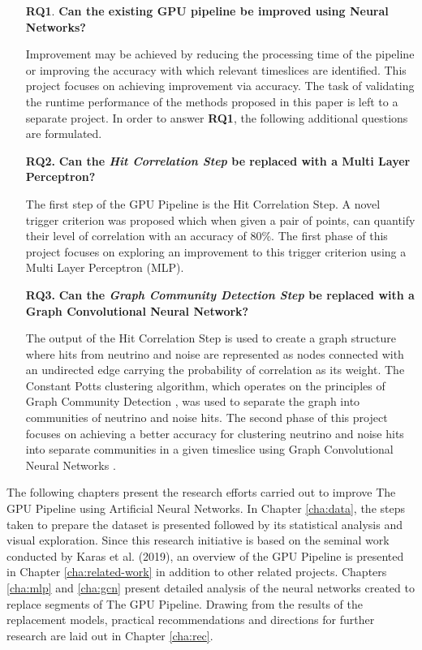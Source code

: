 \begin{enumerate}
  \item[\textbf{RQ1}.] \textbf{Can the existing GPU pipeline be improved using Neural Networks?}

    Improvement may be achieved by reducing the processing time of the
    pipeline or improving the accuracy with which relevant timeslices
    are identified. This project focuses on achieving improvement via
    accuracy. The task of validating the runtime performance of the
    methods proposed in this paper is left to a separate project. In
    order to answer \textbf{RQ1}, the following additional questions
    are formulated.

  \item[\textbf{RQ2.}] \textbf{Can the \emph{Hit Correlation Step} be replaced with a Multi Layer Perceptron?}

    The first step of the GPU Pipeline is the Hit Correlation Step. A
    novel trigger criterion was proposed which when given a pair of
    points, can quantify their level of correlation with an accuracy
    of 80\%. The first phase of this project focuses on exploring an
    improvement to this trigger criterion using a Multi Layer
    Perceptron (MLP).
    
  \item[\textbf{RQ3.}] \textbf{Can the \emph{Graph Community Detection Step} be replaced with a Graph Convolutional Neural Network?}

    The output of the Hit Correlation Step is used to create a graph
    structure where hits from neutrino and noise are represented as
    nodes connected with an undirected edge carrying the probability
    of correlation as its weight. The Constant Potts clustering
    algorithm, which operates on the principles of Graph Community
    Detection \cite{fortunato2010community}, was used to separate the
    graph into communities of neutrino and noise hits. The second
    phase of this project focuses on achieving a better accuracy for
    clustering neutrino and noise hits into separate communities in a
    given timeslice using Graph Convolutional Neural Networks
    \cite{kipf2016semi}.
\end{enumerate}

The following chapters present the research efforts carried out to
improve The GPU Pipeline using Artificial Neural Networks. In Chapter
\ref{cha:data}, the steps taken to prepare the dataset is presented
followed by its statistical analysis and visual exploration. Since
this research initiative is based on the seminal work conducted by
Karas et al. (2019), an overview of the GPU Pipeline is presented in
Chapter \ref{cha:related-work} in addition to other related projects.
Chapters \ref{cha:mlp} and \ref{cha:gcn} present detailed analysis of
the neural networks created to replace segments of The GPU Pipeline.
Drawing from the results of the replacement models, practical
recommendations and directions for further research are laid out in
Chapter \ref{cha:rec}.

